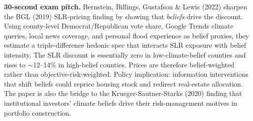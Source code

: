 \documentclass[11pt]{article}
\begin{document}
\begin{keybox}
\textbf{30-second exam pitch.} Bernstein, Billings, Gustafson \& Lewis (2022) sharpen the BGL (2019) SLR-pricing finding by showing that \emph{beliefs} drive the discount. Using county-level Democrat/Republican vote share, Google Trends climate queries, local news coverage, and personal flood experience as belief proxies, they estimate a triple-difference hedonic spec that interacts SLR exposure with belief intensity. The SLR discount is essentially zero in low-climate-belief counties and rises to $\sim$12--14\% in high-belief counties. Prices are therefore belief-weighted rather than objective-risk-weighted. Policy implication: information interventions that shift beliefs could reprice housing stock and redirect real-estate allocation. The paper is also the bridge to the Krueger-Sautner-Starks (2020) finding that institutional investors' climate beliefs drive their risk-management motives in portfolio construction.
\end{keybox}
\end{document}
